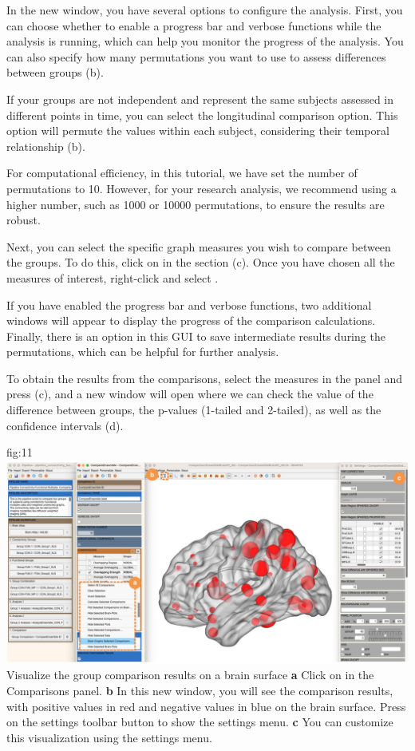 \documentclass[justified]{tufte-handout}
\begin{document}
 
In the new window, you have several options to configure the analysis. First, you can choose whether to enable a progress bar and verbose functions while the analysis is running, which can help you monitor the progress of the analysis. You can also specify how many permutations you want to use to assess differences between groups (b).

If your groups are not independent and represent the same subjects assessed in different points in time, you can select the longitudinal comparison option. This option will permute the values within each subject, considering their temporal relationship (b).

For computational efficiency, in this tutorial, we have set the number of permutations to 10. However, for your research analysis, we recommend using a higher number, such as 1000 or 10000 permutations, to ensure the results are robust.

Next, you can select the specific graph measures you wish to compare between the groups. To do this, click on  in the  section (c). Once you have chosen all the measures of interest, right-click and select .

If you have enabled the progress bar and verbose functions, two additional windows will appear to display the progress of the comparison calculations. Finally, there is an option in this GUI to save intermediate results during the permutations, which can be helpful for further analysis.
 
To obtain the results from the comparisons, select the measures in the  panel and press  ({c}), and a new window will open where we can check the value of the difference between groups, the p-values (1-tailed and 2-tailed), as well as the confidence intervals ({d}).

	{fig:11}
	{\includegraphics{fig11.jpg}}
	{Visualize the group comparison results on a brain surface}
	{
	{\bf a} Click on  in the Comparisons panel.
	{\bf b} In this new window, you will see the comparison results, with positive values in red and negative values in blue on the brain surface. Press on the settings toolbar button to show the settings menu.
{\bf c} You can customize this visualization using the settings menu.
	}
\end{document}

